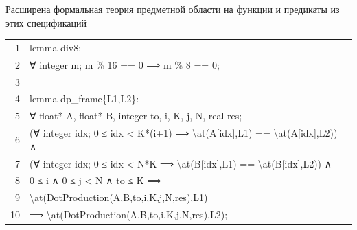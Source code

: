 \documentclass[aspectratio=169, 11pt]{beamer}
\newcommand{\AK}[1]{\textcolor{acslkw}{#1}}   %
\newcommand{\AT}[1]{\textcolor{acslty}{#1}}   %
\newcommand{\AQ}[1]{\textcolor{acslqu}{#1}}   %
\newcommand{\AI}[1]{\textcolor{acslid}{#1}}   %
\newcommand{\AN}[1]{\textcolor{acslnm}{#1}}   %
\newcommand{\AL}[1]{\textcolor{acsllg}{#1}}   %
\newcommand{\ALB}[1]{\textcolor{acsllb}{#1}}  %
\begin{document}
\begin{frame}[fragile]{Расширена формальная теория предметной области на функции и предикаты из этих спецификаций}
	\ttfamily\small
	\setlength{\baselineskip}{1.15em}
	\setlength{\parindent}{0pt}
	
	\begingroup
	\setlength{\fboxsep}{0pt}%
	\colorbox{codebg}{%
		\begin{minipage}{\linewidth}
			\vspace{6pt}%
			\hspace{8pt}%
			\begin{tabular}{@{}r@{\hspace{1.2em}}l@{}}
				\textcolor{ln}{1} & \AK{lemma} \AI{div8}: \\
				\textcolor{ln}{2} & \hspace{2em}\AQ{∀} \AT{integer} \AI{m}; \AI{m} \AL{\%} \AN{16} \AL{==} \AN{0} \AL{⟹} \AI{m} \AL{\%} \AN{8} \AL{==} \AN{0}; \\
				\textcolor{ln}{3} & \\
				\textcolor{ln}{4} & \AK{lemma} \AI{dp\_frame}\{\ALB{L1},\ALB{L2}\}: \\
				\textcolor{ln}{5} & \hspace{2em}\AQ{∀} \AT{float*} \AI{A}, \AT{float*} \AI{B}, \AT{integer} \AI{to}, \AI{i}, \AI{K}, \AI{j}, \AI{N}, \AT{real} \AI{res}; \\
				\textcolor{ln}{6} & \hspace{2em}(\AQ{∀} \AT{integer} \AI{idx}; \AN{0} \AL{≤} \AI{idx} \AL{<} \AI{K}\AI{*}(\AI{i}\AN{+1}) \AL{⟹} \AI{\textbackslash at}(\AI{A}[\AI{idx}],\ALB{L1}) \AL{==} \AI{\textbackslash at}(\AI{A}[\AI{idx}],\ALB{L2})) \AL{∧} \\
				\textcolor{ln}{7} & \hspace{2em}(\AQ{∀} \AT{integer} \AI{idx}; \AN{0} \AL{≤} \AI{idx} \AL{<} \AI{N}\AI{*}\AI{K} \AL{⟹} \AI{\textbackslash at}(\AI{B}[\AI{idx}],\ALB{L1}) \AL{==} \AI{\textbackslash at}(\AI{B}[\AI{idx}],\ALB{L2})) \AL{∧} \\
				\textcolor{ln}{8} & \hspace{2em}\AN{0} \AL{≤} \AI{i} \AL{∧} \AN{0} \AL{≤} \AI{j} \AL{<} \AI{N} \AL{∧} \AI{to} \AL{≤} \AI{K} \AL{⟹} \\
				\textcolor{ln}{9} & \hspace{2em}\AI{\textbackslash at}(\AI{DotProduction}(\AI{A},\AI{B},\AI{to},\AI{i},\AI{K},\AI{j},\AI{N},\AI{res}),\ALB{L1}) \\
				\textcolor{ln}{10} & \hspace{2em}\AL{⟹} \AI{\textbackslash at}(\AI{DotProduction}(\AI{A},\AI{B},\AI{to},\AI{i},\AI{K},\AI{j},\AI{N},\AI{res}),\ALB{L2}); \\
			\end{tabular}
			\hspace{8pt}%
			\vspace{4pt}%
		\end{minipage}%
	}%
	\endgroup
\end{frame}
\end{document}
